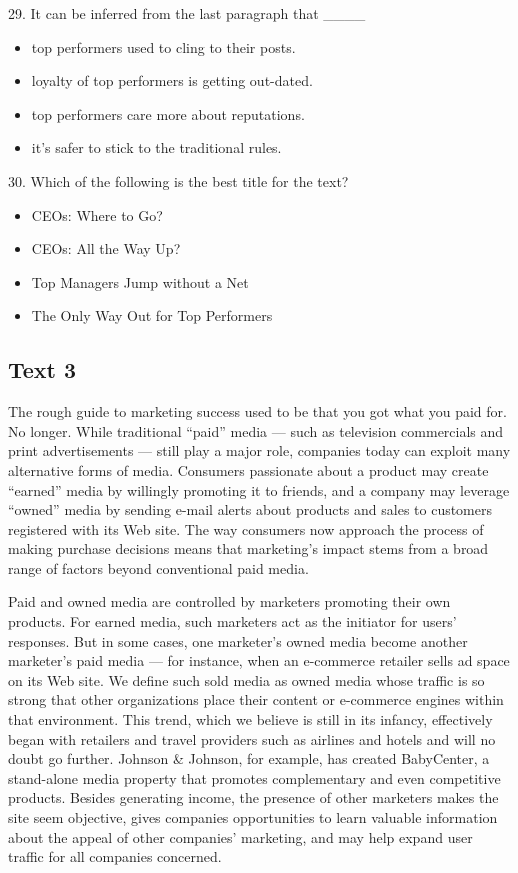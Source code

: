 \documentclass[UTF8,11pt]{ctexart}
\begin{document}
29. It can be inferred from the last paragraph that \_\_\_\_


\begin{itemize}[leftmargin=2em,itemsep=.2em,topsep=.4em]\item[A.] top performers used to cling to their posts.
\item[B.] loyalty of top performers is getting out-dated.
\item[C.] top performers care more about reputations.
\item[D.] it's safer to stick to the traditional rules.
\end{itemize}

30. Which of the following is the best title for the text?


\begin{itemize}[leftmargin=2em,itemsep=.2em,topsep=.4em]\item[A.] CEOs: Where to Go?
\item[B.] CEOs: All the Way Up?
\item[C.] Top Managers Jump without a Net
\item[D.] The Only Way Out for Top Performers
\end{itemize}

\subsection*{\textbf{Text 3}}


The rough guide to marketing success used to be that you got what you paid for. No longer. While traditional “paid” media — such as television commercials and print advertisements — still play a major role, companies today can exploit many alternative forms of media. Consumers passionate about a product may create “earned” media by willingly promoting it to friends, and a company may leverage “owned” media by sending e-mail alerts about products and sales to customers registered with its Web site. The way consumers now approach the process of making purchase decisions means that marketing's impact stems from a broad range of factors beyond conventional paid media.


Paid and owned media are controlled by marketers promoting their own products. For earned media, such marketers act as the initiator for users' responses. But in some cases, one marketer's owned media become another marketer's paid media — for instance, when an e-commerce retailer sells ad space on its Web site. We define such sold media as owned media whose traffic is so strong that other organizations place their content or e-commerce engines within that environment. This trend, which we believe is still in its infancy, effectively began with retailers and travel providers such as airlines and hotels and will no doubt go further. Johnson \& Johnson, for example, has created BabyCenter, a stand-alone media property that promotes complementary and even competitive products. Besides generating income, the presence of other marketers makes the site seem objective, gives companies opportunities to learn valuable information about the appeal of other companies' marketing, and may help expand user traffic for all companies concerned.
\end{document}
